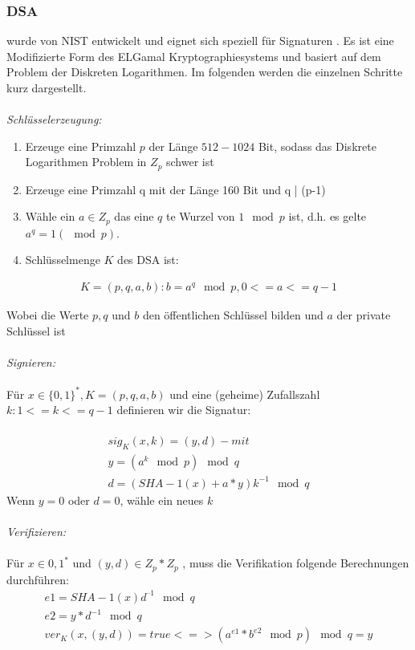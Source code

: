 \subsubsection{DSA}
wurde von NIST entwickelt und eignet sich speziell für Signaturen . Es ist eine Modifizierte Form des ELGamal Kryptographiesystems und basiert auf dem Problem der Diskreten Logarithmen. Im folgenden werden die einzelnen Schritte kurz dargestellt. \\\\
\textit{Schlüsselerzeugung:} 
\begin{enumerate}
\item Erzeuge eine Primzahl $p$ der Länge $512-1024$ Bit, sodass das Diskrete
Logarithmen Problem in $Z_p$ schwer ist
\item Erzeuge eine Primzahl q mit der Länge 160 Bit und q | (p-1)
\item Wähle ein $a \in Z_p$ das eine $q$ te Wurzel von $1 \mod p$ ist, d.h. es gelte
$a^q = 1 (\mod p)$.
\item Schlüsselmenge $K$ des DSA ist:

\end{enumerate}
\begin{equation}
	\begin{split}
		K=(p,q,a,b) :b=a^q \mod p,     0<=a<=q-1
 	\end{split}
\end{equation}
	
Wobei die Werte $p, q$ und $b$ den öffentlichen Schlüssel bilden und
$a$ der private Schlüssel ist
\\\\
\textit{Signieren:} 
\\\\
Für $x \in \{0,1\}^*, K = (p, q,  a, b)$ und eine (geheime) Zufallszahl $k: 1<=k<= q-1$
definieren wir die Signatur:
\\\\
\begin{equation}
	\begin{split}
		sig_K(x,k)=(y,d)-    mit	\\	
	y=(a^k \mod p) \mod q \\
			d=(SHA-1(x)+a*y)k^{-1} \mod q 
 	\end{split}
\end{equation}
Wenn $y = 0$ oder $d = 0$, wähle ein neues $k$	
\\\\
\textit{Verifizieren:}
\\\\
Für $x \in {0,1}^*$ und $(y, d) \in Z_p * Z_p$ , muss die Verifikation folgende
Berechnungen durchführen:
\begin{equation}
\begin{split}
		e1 = SHA-1(x) d^{–1} \mod q	\\	
		e2 = y*d^{-1} \mod q \\
			ver_K(x, (y,d)) = true <=> (a^{e1}*b^{e2} \mod p) \mod q = y 
\end{split}
\end{equation}